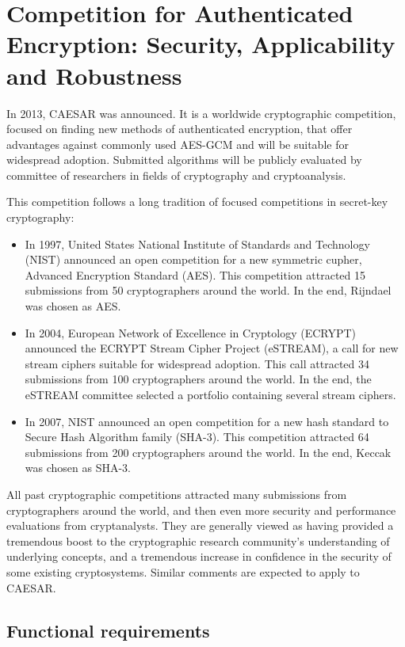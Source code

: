 \chapter{Competition for Authenticated Encryption: Security, Applicability and Robustness}

In 2013, CAESAR was announced. It is a worldwide cryptographic competition, focused on finding new methods of authenticated encryption, that offer advantages against commonly used AES-GCM and will be suitable for widespread adoption. Submitted algorithms will be publicly evaluated by committee of researchers in fields of cryptography and cryptoanalysis.

This competition follows a long tradition of focused competitions in secret-key cryptography:

\begin{itemize}
  \item In 1997, United States National Institute of Standards and Technology (NIST) announced an open competition for a new symmetric cupher, Advanced Encryption Standard (AES). This competition attracted 15 submissions from 50 cryptographers around the world. In the end, Rijndael was chosen as AES.
  \item In 2004, European Network of Excellence in Cryptology (ECRYPT) announced the ECRYPT Stream Cipher Project (eSTREAM), a call for new stream ciphers suitable for widespread adoption. This call attracted 34 submissions from 100 cryptographers around the world. In the end, the eSTREAM committee selected a portfolio containing several stream ciphers.
  \item In 2007, NIST announced an open competition for a new hash standard to Secure Hash Algorithm family (SHA-3). This competition attracted 64 submissions from 200 cryptographers around the world. In the end, Keccak was chosen as SHA-3.
\end{itemize}

All past cryptographic competitions attracted many submissions from cryptographers around the world, and then even more security and performance evaluations from cryptanalysts. They are generally viewed as having provided a tremendous boost to the cryptographic research community's understanding of underlying concepts, and a tremendous increase in confidence in the security of some existing cryptosystems. Similar comments are expected to apply to CAESAR. \cite{crypto-competitions}



\section{Functional requirements}

